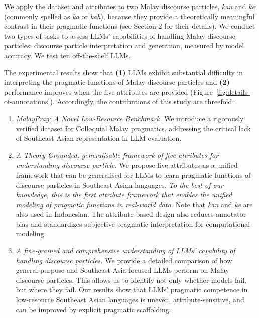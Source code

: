\documentclass[11pt]{article}
\begin{document}
We apply the dataset and attributes to two Malay discourse particles, \textit{kan} and \textit{ke} (commonly spelled as \textit{ka} or \textit{kah}), because they provide a theoretically meaningful contrast in their pragmatic functions (see Section 2 for their details). We conduct two types of tasks to assess LLMs’ capabilities of handling Malay discourse particles: discourse particle interpretation and generation, measured by model accuracy. We test ten off-the-shelf LLMs.


The experimental results show that \textbf{(1)} LLMs exhibit substantial difficulty in interpreting the pragmatic functions of Malay discourse particles and \textbf{(2)} performance improves when the five attributes are provided (Figure~\ref{fig:details-of-annotations}). Accordingly, the contributions of this study are threefold:
\begin{enumerate}[leftmargin=*, itemsep=0pt, topsep=0pt]
    \item \textit{MalayPrag: A Novel Low-Resource Benchmark.} We introduce a rigorously verified dataset for Colloquial Malay pragmatics, addressing the critical lack of Southeast Asian representation in LLM evaluation.
    \item \textit{A Theory-Grounded, generalisable framework of five attributes for understanding discourse particle.} We propose five attributes as a unified framework that can be generalised for LLMs to learn pragmatic functions of discourse particles in Southeast Asian languages. \textit{To the best of our knowledge, this is the first attribute framework that enables the unified modeling of pragmatic functions in real-world data.} Note that \textit{kan} and \textit{ke} are also used in Indonesian. The attribute-based design also reduces annotator bias and standardizes subjective pragmatic interpretation for computational modeling.
    \item \textit{A fine-grained and comprehensive understanding of LLMs' capability of handling discourse particles.} We provide a detailed comparison of how general-purpose and Southeast Asia-focused LLMs perform on Malay discourse particles. This allows us to identify not only whether models fail, but where they fail. Our results show that LLMs' pragmatic competence in low-resource Southeast Asian languages is uneven, attribute-sensitive, and can be improved by explicit pragmatic scaffolding.
\end{enumerate}


\end{document}
